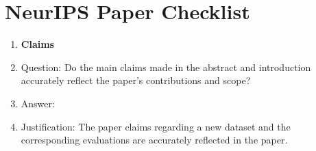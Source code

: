 \newpage
\section*{NeurIPS Paper Checklist}

\begin{enumerate}

\item {\bf Claims}
    \item[] Question: Do the main claims made in the abstract and introduction accurately reflect the paper's contributions and scope?
    \item[] Answer: \answerYes{} %
    \item[] Justification: The paper claims regarding a new dataset and the corresponding evaluations are accurately reflected in the paper. 


\end{enumerate}
